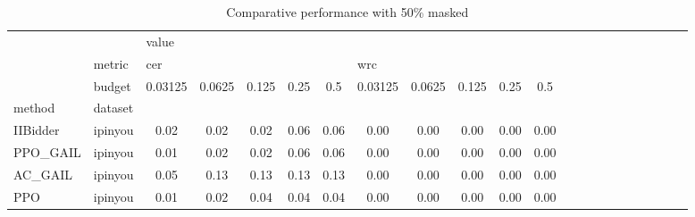 \begin{table}[htbp]
\centering
\caption{Comparative performance with 50\% masked}
\label{mask_0.50}
\begin{tabular}{l|l|cc|cc|cc|cc|cc|cc|cc|cc|cc|cc}
\toprule
    & {} & \multicolumn{10}{l}{value} \\
    & metric & \multicolumn{5}{l}{cer} & \multicolumn{5}{l}{wrc} \\
    & budget & 0.03125 & 0.0625 & 0.125 & 0.25 &  0.5 & 0.03125 & 0.0625 & 0.125 & 0.25 &  0.5 \\
method & dataset &         &        &       &      &      &         &        &       &      &      \\
\midrule
IIBidder & ipinyou &    0.02 &   0.02 &  0.02 & 0.06 & 0.06 &    0.00 &   0.00 &  0.00 & 0.00 & 0.00 \\
PPO\_GAIL & ipinyou &    0.01 &   0.02 &  0.02 & 0.06 & 0.06 &    0.00 &   0.00 &  0.00 & 0.00 & 0.00 \\
AC\_GAIL & ipinyou &    0.05 &   0.13 &  0.13 & 0.13 & 0.13 &    0.00 &   0.00 &  0.00 & 0.00 & 0.00 \\
PPO & ipinyou &    0.01 &   0.02 &  0.04 & 0.04 & 0.04 &    0.00 &   0.00 &  0.00 & 0.00 & 0.00 \\
\bottomrule
\end{tabular}
\end{table}
